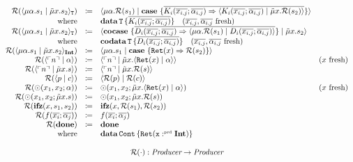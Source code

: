\[\begin{array}{rcll}
    \redundancy{\cut{\mu\alpha.s_1}{\tilde{\mu}x.s_2}_\mathtt{T}} & \coloneq & \cut{\mu\alpha.\redundancy{s_1}}{\case{\overline{K_i(\overline{x_{i,j}}; \overline{\alpha_{i,j}}) \Rightarrow \cut{K_i(\overline{x_{i,j}}; \overline{\alpha_{i,j}})}{\tilde{\mu}x.\redundancy{s_2}}}}} & \\
    \text{where} &  & \data{T}{\overline{K_i(\overline{x_{i,j}}; \overline{\alpha_{i,j}})}} \quad \fresh{\overline{x_{i,j}}, \overline{\alpha_{i,j}}} & \\
    \redundancy{\cut{\mu\alpha.s_1}{\tilde{\mu}x.s_2}_\mathtt{T}} & \coloneq & \cut{\cocase{\overline{D_i(\overline{x_{i,j}}; \overline{\alpha_{i,j}}) \Rightarrow \cut{\mu\alpha.\redundancy{s_1}}{D_i(\overline{x_{i,j}}; \overline{\alpha_{i,j}})}}}}{\tilde{\mu}x.s_2} & \\
    \text{where} &  & \codata{T}{\overline{D_i(\overline{x_{i,j}}; \overline{\alpha_{i,j}})}} \quad \fresh{\overline{x_{i,j}}, \overline{\alpha_{i,j}}} & \\
    \redundancy{\cut{\mu\alpha.s_1}{\tilde{\mu}x.s_2}_\tyint} & \coloneq & \cut{\mu\alpha.s_1}{\case{\mathtt{Ret}(x) \Rightarrow \redundancy{s_2}}} & \\
    \redundancy{\cut{\lit{n}}{\alpha}} & \coloneq & \cut{\lit{n}}{\tilde{\mu}x.\cut{\mathtt{Ret}(x)}{\alpha}} & \fresh{x} \\
    \redundancy{\cut{\lit{n}}{\tilde{\mu}x.s}} & \coloneq & \cut{\lit{n}}{\tilde{\mu}x.\redundancy{s}} & \\
    \redundancy{\cut{p}{c}} & \coloneq & \cut{\redundancy{p}}{\redundancy{c}} & \\
    \redundancy{\odot(x_1, x_2; \alpha)}{} & \coloneq & \odot(x_1, x_2; \tilde{\mu}x.\cut{\mathtt{Ret}(x)}{\alpha}) & \fresh{x} \\
    \redundancy{\odot(x_1, x_2; \tilde{\mu}x.s)}{} & \coloneq & \odot(x_1, x_2; \tilde{\mu}x.\redundancy{s}) & \\
    \redundancy{\ifz{x}{s_1}{s_2}}{} & \coloneq & \ifz{x}{\redundancy{s_1}}{\redundancy{s_2}} & \\
    \redundancy{f(\overline{x_i}; \overline{\alpha_j})}{} & \coloneq & f(\overline{x_i}; \overline{\alpha_j}) & \\
    \redundancy{\done}{} & \coloneq & \done & \\
    \text{where} & & \data{Cont}{\mathtt{Ret(x \prd \tyint)}} & \\
    \\
    \multicolumn{4}{c}{\redundancy{\cdot} : \emph{Producer} \rightarrow \emph{Producer}}\\

\end{array}\]
